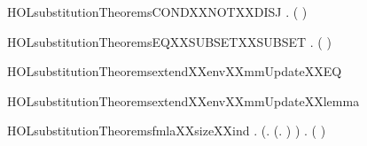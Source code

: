 \newcommand{\HOLsubstitutionTheoremsCONDXXNOT}{\UseVerbatim{HOLsubstitutionTheoremsCONDXXNOT}}
\begin{SaveVerbatim}{HOLsubstitutionTheoremsCONDXXNOTXXDISJ}
\HOLTokenTurnstile{} \HOLSymConst{\HOLTokenForall{}}   .
     ( \HOLSymConst{\HOLTokenNeg{}} \HOLSymConst{\HOLTokenDisj{}}     ) \HOLSymConst{=}
               
\end{SaveVerbatim}
\newcommand{\HOLsubstitutionTheoremsCONDXXNOTXXDISJ}{\UseVerbatim{HOLsubstitutionTheoremsCONDXXNOTXXDISJ}}
\begin{SaveVerbatim}{HOLsubstitutionTheoremsEQXXSUBSETXXSUBSET}
\HOLTokenTurnstile{} \HOLSymConst{\HOLTokenForall{}} . ( \HOLSymConst{=} ) \HOLSymConst{\HOLTokenEquiv{}}  \HOLConst{\HOLTokenSubset{}}  \HOLSymConst{\HOLTokenConj{}}  \HOLConst{\HOLTokenSubset{}} 
\end{SaveVerbatim}
\newcommand{\HOLsubstitutionTheoremsEQXXSUBSETXXSUBSET}{\UseVerbatim{HOLsubstitutionTheoremsEQXXSUBSETXXSUBSET}}
\begin{SaveVerbatim}{HOLsubstitutionTheoremsextendXXenvXXmmUpdateXXEQ}
\HOLTokenTurnstile{}     \HOLSymConst{=}    
\end{SaveVerbatim}
\newcommand{\HOLsubstitutionTheoremsextendXXenvXXmmUpdateXXEQ}{\UseVerbatim{HOLsubstitutionTheoremsextendXXenvXXmmUpdateXXEQ}}
\begin{SaveVerbatim}{HOLsubstitutionTheoremsextendXXenvXXmmUpdateXXlemma}
\HOLTokenTurnstile{}      \HOLSymConst{=}     
\end{SaveVerbatim}
\newcommand{\HOLsubstitutionTheoremsextendXXenvXXmmUpdateXXlemma}{\UseVerbatim{HOLsubstitutionTheoremsextendXXenvXXmmUpdateXXlemma}}
\begin{SaveVerbatim}{HOLsubstitutionTheoremsfmlaXXsizeXXind}
\HOLTokenTurnstile{} \HOLSymConst{\HOLTokenForall{}}.
     (\HOLSymConst{\HOLTokenForall{}}. (\HOLSymConst{\HOLTokenForall{}}.   \HOLSymConst{\HOLTokenLt{}}   \HOLSymConst{\HOLTokenImp{}}  ) \HOLSymConst{\HOLTokenImp{}}  ) \HOLSymConst{\HOLTokenImp{}}
     \HOLSymConst{\HOLTokenForall{}} . (  \HOLSymConst{=} ) \HOLSymConst{\HOLTokenImp{}}  
\end{SaveVerbatim}
